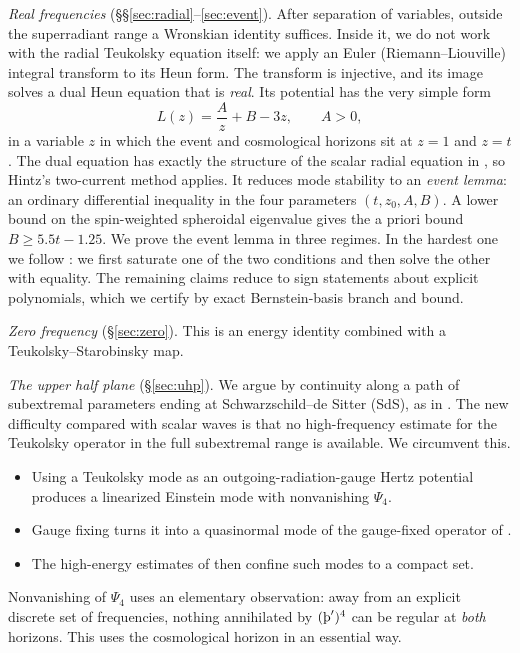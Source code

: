 \documentclass[11pt]{amsart}
\theoremstyle{definition}
\theoremstyle{remark}
\numberwithin{equation}{section}
\newcommand{\Th}{\text{\th}}
\begin{document}
\emph{Real frequencies} (\S\S\ref{sec:radial}--\ref{sec:event}). After separation of variables, outside the
superradiant range a Wronskian identity suffices. Inside it, we do not work with the radial Teukolsky equation
itself: we apply an Euler (Riemann--Liouville) integral transform to its Heun form. The transform is injective, and its
image solves a dual Heun equation that is \emph{real}. Its potential has the very simple form
\[
L(z)=\frac{A}{z}+B-3z,\qquad A>0,
\]
in a variable $z$ in which the event and cosmological horizons sit at $z=1$ and $z=t$. The dual equation has exactly
the structure of the scalar radial equation in \cite{Hin26}, so Hintz's two-current method applies. It reduces mode
stability to an \emph{event lemma}: an ordinary differential inequality in the four parameters $(t,z_0,A,B)$. A lower
bound on the spin-weighted spheroidal eigenvalue gives the a priori bound $B\ge5.5t-1.25$. We prove the event lemma
in three regimes. In the hardest one we follow \cite[\S4.3.3]{Hin26}: we first saturate one of the two conditions and
then solve the other with equality. The remaining claims reduce to sign statements about explicit polynomials, which
we certify by exact Bernstein-basis branch and bound.

\emph{Zero frequency} (\S\ref{sec:zero}). This is an energy identity combined with a Teukolsky--Starobinsky map.

\emph{The upper half plane} (\S\ref{sec:uhp}). We argue by continuity along a path of subextremal parameters ending
at Schwarzschild--de Sitter (SdS), as in \cite[\S6]{Hin26}. The new difficulty compared with scalar waves is that no
high-frequency estimate for the Teukolsky operator in the full subextremal range is available. We circumvent this.
\begin{itemize}
\item Using a Teukolsky mode as an outgoing-radiation-gauge Hertz potential \cite{Wal78} produces a linearized
Einstein mode with nonvanishing $\Psi_4$.
\item Gauge fixing turns it into a quasinormal mode of the gauge-fixed operator of \cite{HPV25}.
\item The high-energy estimates of \cite{HPV25} then confine such modes to a compact set.
\end{itemize}
Nonvanishing of $\Psi_4$ uses an elementary observation: away from an explicit discrete set of frequencies, nothing
annihilated by $(\Th')^4$ can be regular at \emph{both} horizons. This uses the cosmological horizon in an essential
way.
\end{document}
